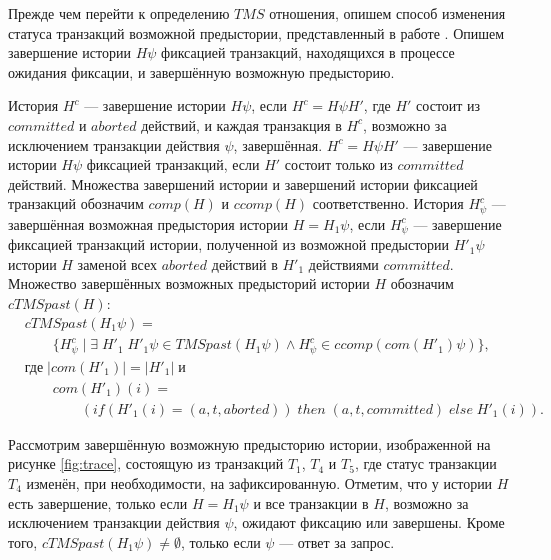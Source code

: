 Прежде чем перейти к определению $TMS$ отношения, опишем способ изменения статуса транзакций возможной предыстории, представленный в работе \cite{tms_article}. Опишем завершение истории $H\psi$ фиксацией транзакций, находящихся в процессе ожидания фиксации, и завершённую возможную предысторию.
\begin{mydefinition}\label{suff_comm_compl}
История $H^c$ --- завершение истории $H\psi$, если $H^c = H\psi{H'}$, где $H'$ состоит из $committed$ и $aborted$ действий, и каждая транзакция в $H^c$, возможно за исключением транзакции действия $\psi$, завершённая. $H^c = H\psi{H'}$ --- завершение истории $H\psi$ фиксацией транзакций, если $H'$ состоит только из $committed$ действий. Множества завершений истории и завершений истории фиксацией транзакций обозначим $comp(H)$ и $ccomp(H)$ соответственно.
История $H^c_{\psi}$ --- завершённая возможная предыстория истории $H = H_1\psi$, если $H^c_{\psi}$ --- завершение фиксацией транзакций истории, полученной из возможной предыстории $H'_1\psi$ истории $H$ заменой всех $aborted$ действий в $H'_1$ действиями $committed$. Множество завершённых возможных предысторий истории $H$ обозначим $cTMSpast(H)$: 
\begin{align*}
&cTMSpast(H_1\psi) = \\
&\qquad \{H^c_{\psi} \; | \; \exists \; H'_1  \; H'_1\psi \in TMSpast(H_1\psi) \land 
H^c_{\psi} \in ccomp(com(H'_1)\psi) \}, \\
&\text{где} \; |com(H'_1)| = |H'_1| \; \text{и} \\
& \qquad com(H'_1)(i) = \\
&\qquad \qquad (if \left (H'_1(i) = (a, t, aborted)\right)\; then \; (a, t, committed) \; else \; H'_1(i)).
\end{align*}
\end{mydefinition}

Рассмотрим завершённую возможную предысторию истории, изображенной на рисунке \ref{fig:trace}, состоящую из транзакций $T_1$, $T_4$ и $T_5$, где статус транзакции $T_4$ изменён, при необходимости, на зафиксированную. Отметим, что у истории $H$ есть завершение, только если $H = H_1\psi$ и все транзакции в $H$, возможно за исключением транзакции действия $\psi$, ожидают фиксацию или завершены. Кроме того, $cTMSpast(H_1\psi) \neq \emptyset$, только если $\psi$ --- ответ за запрос.


